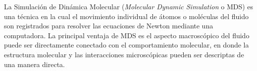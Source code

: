 La Simulación de Dinámica Molecular (\textit{Molecular Dynamic Simulation} o MDS) es una técnica en la cual el movimiento individual de átomos o moléculas del fluido son registrados para resolver las ecuaciones de Newton mediante una computadora.
La principal ventaja de MDS es el aspecto macroscópico del fluido puede ser directamente conectado con el comportamiento molecular, en donde la estructura molecular y las interacciones microscópicas pueden ser descriptas de una manera directa.



